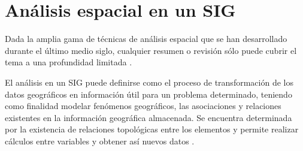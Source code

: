 \section{Análisis espacial en un SIG}
\label{sec:cap2-analisis-espacial-sig}
Dada la amplia gama de técnicas de análisis espacial que se han desarrollado durante
el último medio siglo, cualquier resumen o revisión sólo puede cubrir el tema a una
profundidad limitada \citep{rojas2012ejecucion}.

El análisis en un SIG puede definirse como el proceso de transformación de los datos geográficos
en información útil para un problema determinado, teniendo como finalidad modelar fenómenos
geográficos, las asociaciones y relaciones existentes en la información geográfica almacenada. Se
encuentra determinada por la existencia de relaciones topológicas entre los elementos y permite
realizar cálculos entre variables y obtener así nuevos datos \citep{bravo2000breve}.

